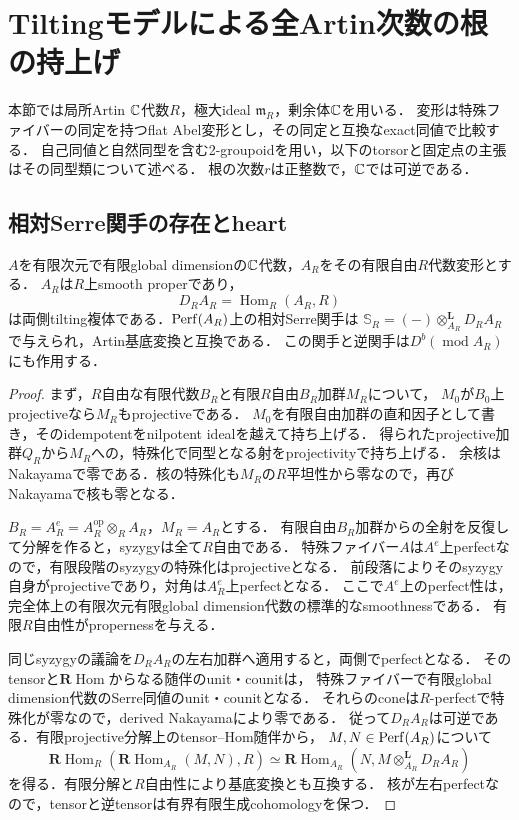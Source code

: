 \section{Tiltingモデルによる全Artin次数の根の持上げ}
\label{sec:artin}
本節では局所Artin $\mathbb C$代数$R$，極大ideal $\mathfrak m_R$，剰余体$\mathbb C$を用いる．
変形は特殊ファイバーの同定を持つflat Abel変形とし，その同定と互換なexact同値で比較する．
自己同値と自然同型を含む2-groupoidを用い，以下のtorsorと固定点の主張はその同型類について述べる．
根の次数$r$は正整数で，$\mathbb C$では可逆である．

\subsection{相対Serre関手の存在とheart}
\begin{lemma}[有限代数モデルの相対双対性]\label{lem:relative-algebra}
$A$を有限次元で有限global dimensionの$\mathbb C$代数，$A_R$をその有限自由$R$代数変形とする．
$A_R$は$R$上smooth properであり，
\[
 D_RA_R=\operatorname{Hom}_R(A_R,R)
\]
は両側tilting複体である．$\operatorname{Perf}(A_R)$上の相対Serre関手は
$\mathbb S_R=(-)\otimes^{\mathbf L}_{A_R}D_RA_R$で与えられ，Artin基底変換と互換である．
この関手と逆関手は$D^b(\operatorname{mod}A_R)$にも作用する．
\end{lemma}
\begin{proof}
まず，$R$自由な有限代数$B_R$と有限$R$自由$B_R$加群$M_R$について，
$M_0$が$B_0$上projectiveなら$M_R$もprojectiveである．
$M_0$を有限自由加群の直和因子として書き，そのidempotentをnilpotent idealを越えて持ち上げる．
得られたprojective加群$Q_R$から$M_R$への，特殊化で同型となる射をprojectivityで持ち上げる．
余核はNakayamaで零である．核の特殊化も$M_R$の$R$平坦性から零なので，再びNakayamaで核も零となる．

$B_R=A_R^e=A_R^{\mathrm{op}}\otimes_R A_R$，$M_R=A_R$とする．
有限自由$B_R$加群からの全射を反復して分解を作ると，syzygyは全て$R$自由である．
特殊ファイバー$A$は$A^e$上perfectなので，有限段階のsyzygyの特殊化はprojectiveとなる．
前段落によりそのsyzygy自身がprojectiveであり，対角は$A_R^e$上perfectとなる．
ここで$A^e$上のperfect性は，完全体上の有限次元有限global dimension代数の標準的なsmoothnessである．
有限$R$自由性がpropernessを与える．

同じsyzygyの議論を$D_RA_R$の左右加群へ適用すると，両側でperfectとなる．
そのtensorと$\mathbf R\operatorname{Hom}$からなる随伴のunit・counitは，
特殊ファイバーで有限global dimension代数のSerre同値のunit・counitとなる．
それらのconeは$R$-perfectで特殊化が零なので，derived Nakayamaにより零である．
従って$D_RA_R$は可逆である．有限projective分解上のtensor--Hom随伴から，
$M,N\in\operatorname{Perf}(A_R)$について
\[
 \mathbf R\operatorname{Hom}_R(\mathbf R\operatorname{Hom}_{A_R}(M,N),R)
 \simeq\mathbf R\operatorname{Hom}_{A_R}(N,M\otimes^{\mathbf L}_{A_R}D_RA_R)
\]
を得る．有限分解と$R$自由性により基底変換とも互換する．
核が左右perfectなので，tensorと逆tensorは有界有限生成cohomologyを保つ．
\end{proof}

